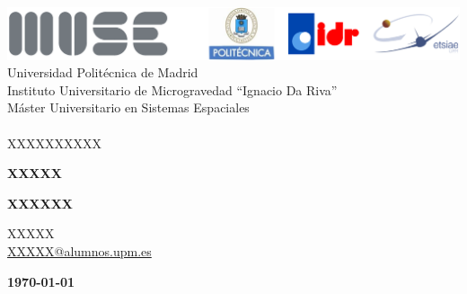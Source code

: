 \documentclass[a4paper,12pt]{article}
\begin{document}
\begin{center}
\thispagestyle{empty}

\includegraphics[width=\textwidth]{Logo_portada.png} \\
\vspace{0.5cm}
{ \large
Universidad Politécnica de Madrid \\
Instituto Universitario de Microgravedad “Ignacio Da Riva” \\
Máster Universitario en Sistemas Espaciales}\\  \hrulefill \\ 
\vspace{0.5cm}
{\large XXXXXXXXXX}\\ 
\vspace{1.5cm} %

{\huge \textbf{XXXXX}}\\ 
\vspace{0.5cm}

{\huge \textbf{XXXXXX}}\\ 
\vspace{0.5cm}

\vspace{1.5cm} %
\begin{center}
        \vspace{0.5cm}
        {\large XXXXX } \\ \href{mailto:XXXXX@alumnos.upm.es} {XXXXX@alumnos.upm.es} \vspace{1.5cm}

\vspace{0.5cm}
\end{center}
\end{center}


\vspace{3.0cm}

\begin{center}
    \large{\textbf{\today}}
\end{center}
\newpage
{}
\thispagestyle{empty}
\end{document}
